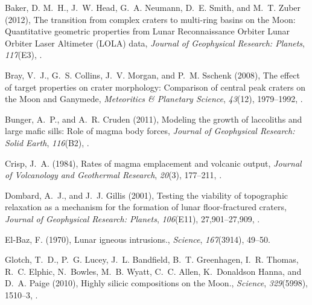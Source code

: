 \begin{article}
\begin{enumerate}
\begin{thebibliography}{39}
Baker, D. M.~H., J.~W. Head, G.~A. Neumann, D.~E. Smith, and M.~T. Zuber
  (2012), {The transition from complex craters to multi-ring basins on the
  Moon: Quantitative geometric properties from Lunar Reconnaissance Orbiter
  Lunar Orbiter Laser Altimeter (LOLA) data}, \textit{Journal of Geophysical
  Research: Planets}, \textit{117}(E3), .

Bray, V.~J., G.~S. Collins, J.~V. Morgan, and P.~M. Sschenk (2008), {The effect
  of target properties on crater morphology: Comparison of central peak craters
  on the Moon and Ganymede}, \textit{Meteoritics \& Planetary Science},
  \textit{43}(12), 1979--1992, .

Bunger, A.~P., and A.~R. Cruden (2011), {Modeling the growth of laccoliths and
  large mafic sills: Role of magma body forces}, \textit{Journal of Geophysical
  Research: Solid Earth}, \textit{116}(B2), .

Crisp, J.~A. (1984), {Rates of magma emplacement and volcanic output},
  \textit{Journal of Volcanology and Geothermal Research}, \textit{20}(3),
  177--211, .

Dombard, A.~J., and J.~J. Gillis (2001), {Testing the viability of topographic
  relaxation as a mechanism for the formation of lunar floor-fractured
  craters}, \textit{Journal of Geophysical Research: Planets},
  \textit{106}(E11), 27,901--27,909, .

El-Baz, F. (1970), {Lunar igneous intrusions.}, \textit{Science},
  \textit{167}(3914), 49--50.

Glotch, T.~D., P.~G. Lucey, J.~L. Bandfield, B.~T. Greenhagen, I.~R. Thomas,
  R.~C. Elphic, N.~Bowles, M.~B. Wyatt, C.~C. Allen, K.~{Donaldson Hanna}, and
  D.~A. Paige (2010), {Highly silicic compositions on the Moon.},
  \textit{Science}, \textit{329}(5998), 1510--3, .


\end{thebibliography}
\end{enumerate}
\end{article}
